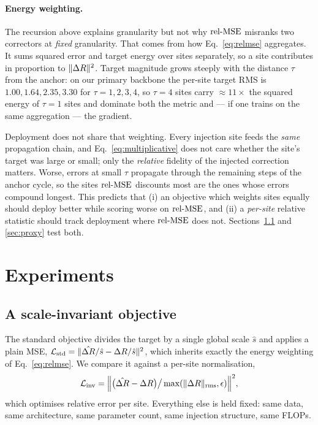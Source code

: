 \paragraph{Energy weighting.} The recursion above explains granularity but not why
$\mathrm{rel\text{-}MSE}$ misranks two correctors at \emph{fixed} granularity. That comes from how
Eq.~\ref{eq:relmse} aggregates. It sums squared error and target energy over sites
separately, so a site contributes in proportion to $\lVert\Delta R\rVert^2$. Target
magnitude grows steeply with the distance $\tau$ from the anchor: on our primary
backbone the per-site target RMS is $1.00, 1.64, 2.35, 3.30$ for
$\tau = 1,2,3,4$, so $\tau{=}4$ sites carry $\approx\!11\times$ the squared energy of
$\tau{=}1$ sites and dominate both the metric and --- if one trains on the same
aggregation --- the gradient.

Deployment does not share that weighting. Every injection site feeds the \emph{same}
propagation chain, and Eq.~\ref{eq:multiplicative} does not care whether the site's
target was large or small; only the \emph{relative} fidelity of the injected
correction matters. Worse, errors at small $\tau$ propagate through the remaining
steps of the anchor cycle, so the sites $\mathrm{rel\text{-}MSE}$ discounts most are the ones whose
errors compound longest. This predicts that (i) an objective which weights sites
equally should deploy better while scoring worse on $\mathrm{rel\text{-}MSE}$, and (ii) a
\emph{per-site} relative statistic should track deployment where $\mathrm{rel\text{-}MSE}$ does not.
Sections~\ref{sec:loss} and \ref{sec:proxy} test both.

\section{Experiments}

\subsection{A scale-invariant objective}
\label{sec:loss}

The standard objective divides the target by a single global scale $\hat{s}$ and
applies a plain MSE, $\mathcal{L}_{\text{std}} = \lVert \hat{\Delta R}/\hat{s} - \Delta R/\hat{s} \rVert^2$,
which inherits exactly the energy weighting of Eq.~\ref{eq:relmse}. We compare it
against a per-site normalisation,
\begin{equation}
\mathcal{L}_{\text{inv}} = \Big\lVert \big(\hat{\Delta R} - \Delta R\big) \big/ \max(\lVert \Delta R \rVert_{\text{rms}}, \epsilon) \Big\rVert^2 ,
\label{eq:invloss}
\end{equation}
which optimises relative error per site. Everything else is held fixed: same data,
same architecture, same parameter count, same injection structure, same FLOPs.

